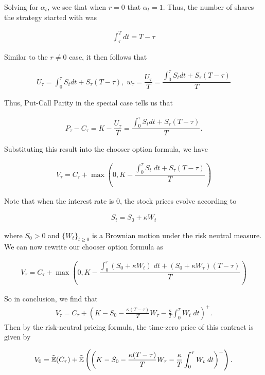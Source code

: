 \documentclass[reqno]{amsart}
\begin{document}
Solving for $\alpha_t$, we see that when $r = 0$ that $\alpha_t = 1$. Thus, the number of shares the strategy started with was

\begin{align}
     \int_\tau^T dt = T - \tau
\end{align}

Similar to the $r \neq 0$ case, it then follows that

\begin{align}
     U_\tau = \int_0^\tau S_t dt + S_\tau (T - \tau), \; w_\tau = \dfrac{U_\tau}{T} = \dfrac{\int_0^\tau S_t dt + S_\tau (T - \tau)}{T}
\end{align}

Thus, Put-Call Parity in the special case tells us that 

\begin{align}
     P_\tau - C_\tau = K - \dfrac{U_\tau}{T} = \dfrac{\int_0^\tau S_t dt + S_\tau (T - \tau)}{T}.
\end{align}

Substituting this result into the chooser option formula, we have

\begin{align}
     V_\tau = C_\tau + \max(0, K - \dfrac{\int_0^\tau S_t \; dt + S_\tau (T - \tau)}{T})
\end{align}

Note that when the interest rate is $0$, the stock prices evolve according to 

\begin{align}
     S_t = S_0 + \kappa W_t
\end{align}

where $S_0 > 0$ and $\{W_t\}_{t \ge 0}$ is a Brownian motion under the risk neutral measure. We can now rewrite our chooser option formula as

\begin{align}
     V_\tau = C_\tau + \max(0, K - \dfrac{\int_0^\tau \left( S_0 + \kappa W_t \right) \; dt + (S_0 + \kappa W_\tau) (T - \tau)}{T})
\end{align}

So in conclusion, we find that 
\begin{align}
     V_\tau = C_\tau + \left(K- S_0 - \frac{\kappa(T-\tau)}{T} W_\tau - \frac{\kappa}{T} \int_0^\tau W_t \; dt  \right)^+.
\end{align}
Then by the risk-neutral pricing formula, the time-zero price of this contract is given by 

\begin{align} \label{eq: expect form}
     V_0 = \tilde{\mathbb{E}}(C_\tau) + \tilde{\mathbb{E}}\left(\left(K- S_0 - \frac{\kappa(T-\tau)}{T} W_\tau - \frac{\kappa}{T} \int_0^\tau W_t \; dt  \right)^+\right).
\end{align}
\end{document}
